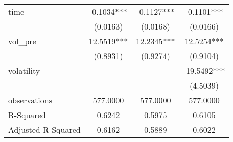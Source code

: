 \begin{tabular}{lccc}
time               & -0.1034*** & -0.1127*** & -0.1101***   \\
                   & (0.0163)   & (0.0168)   & (0.0166)     \\
vol\_pre           & 12.5519*** & 12.2345*** & 12.5254***   \\
                   & (0.8931)   & (0.9274)   & (0.9104)     \\
volatility         &            &            & -19.5492***  \\
                   &            &            & (4.5039)     \\
observations       & 577.0000   & 577.0000   & 577.0000     \\
R-Squared          & 0.6242     & 0.5975     & 0.6105       \\
Adjusted R-Squared & 0.6162     & 0.5889     & 0.6022       \\
\hline
\end{tabular}